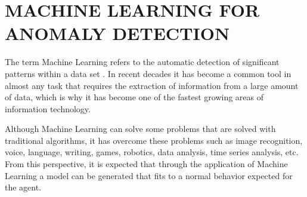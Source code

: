 \chapter{\uppercase{Machine Learning for Anomaly detection}}
\label{Capitulo 3}

The term Machine Learning refers to the automatic detection of significant patterns within a data set \cite{Reference32}. In recent decades it has become a common tool in almost any task that requires the extraction of information from a large amount of data, which is why it has become one of the fastest growing areas of information technology.

\vspace{5mm} %

Although Machine Learning can solve some problems that are solved with traditional algorithms, it has overcome these problems such as image recognition, voice, language, writing, games, robotics, data analysis, time series analysis, etc. From this perspective, it is expected that through the application of Machine Learning a model can be generated that fits to a normal behavior expected for the agent.

\vspace{5mm} %


